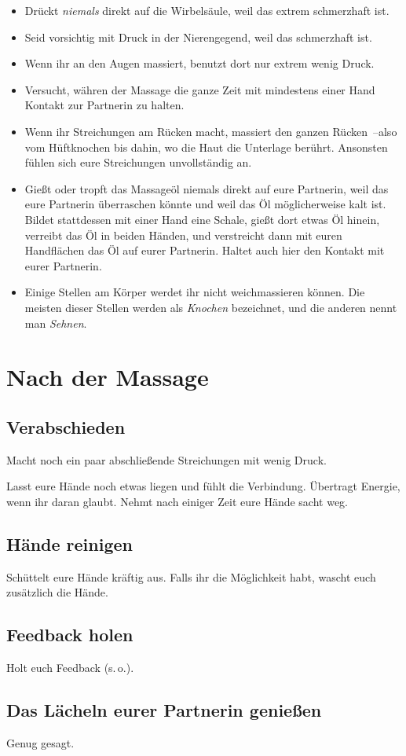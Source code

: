 \begin{itemize}
  \item Drückt \emph{niemals} direkt auf die Wirbelsäule, weil das extrem schmerzhaft ist.
  \item Seid vorsichtig mit Druck in der Nierengegend, weil das schmerzhaft ist.
  \item Wenn ihr an den Augen massiert, benutzt dort nur extrem wenig Druck.
  \item Versucht, währen der Massage die ganze Zeit mit mindestens einer Hand Kontakt zur Partnerin zu halten.
  \item Wenn ihr Streichungen am Rücken macht, massiert den ganzen Rücken~--also vom Hüftknochen bis dahin, wo die Haut die Unterlage berührt. Ansonsten fühlen sich eure Streichungen unvollständig an.
  \item Gießt oder tropft das Massageöl niemals direkt auf eure Partnerin, weil das eure Partnerin überraschen könnte und weil das Öl möglicherweise kalt ist. Bildet stattdessen mit einer Hand eine Schale, gießt dort etwas Öl hinein, verreibt das Öl in beiden Händen, und verstreicht dann mit euren Handflächen das Öl auf eurer Partnerin. Haltet auch hier den Kontakt mit eurer Partnerin.
  \item Einige Stellen am Körper werdet ihr nicht weichmassieren können. Die meisten dieser Stellen werden als \emph{Knochen} bezeichnet, und die anderen nennt man \emph{Sehnen}.
\end{itemize}


\section{Nach der Massage}

\subsection{Verabschieden}

Macht noch ein paar abschließende Streichungen mit wenig Druck.

Lasst eure Hände noch etwas liegen und fühlt die Verbindung. Übertragt Energie, wenn ihr daran glaubt. Nehmt nach einiger Zeit eure Hände sacht weg.


\subsection{Hände reinigen}

Schüttelt eure Hände kräftig aus. Falls ihr die Möglichkeit habt, wascht euch zusätzlich die Hände.


\subsection{Feedback holen}

Holt euch Feedback (s.\,o.).

\subsection{Das Lächeln eurer Partnerin genießen}

Genug gesagt.

